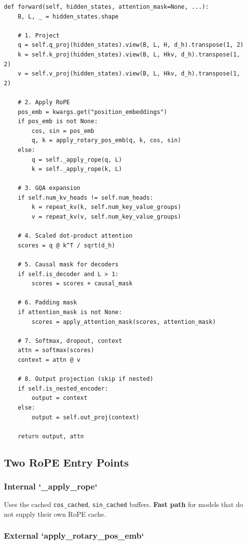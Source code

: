 \begin{lstlisting}
def forward(self, hidden_states, attention_mask=None, ...):
    B, L, _ = hidden_states.shape
    
    # 1. Project
    q = self.q_proj(hidden_states).view(B, L, H, d_h).transpose(1, 2)
    k = self.k_proj(hidden_states).view(B, L, Hkv, d_h).transpose(1, 2)
    v = self.v_proj(hidden_states).view(B, L, Hkv, d_h).transpose(1, 2)
    
    # 2. Apply RoPE
    pos_emb = kwargs.get("position_embeddings")
    if pos_emb is not None:
        cos, sin = pos_emb
        q, k = apply_rotary_pos_emb(q, k, cos, sin)
    else:
        q = self._apply_rope(q, L)
        k = self._apply_rope(k, L)
    
    # 3. GQA expansion
    if self.num_kv_heads != self.num_heads:
        k = repeat_kv(k, self.num_key_value_groups)
        v = repeat_kv(v, self.num_key_value_groups)
    
    # 4. Scaled dot-product attention
    scores = q @ k^T / sqrt(d_h)
    
    # 5. Causal mask for decoders
    if self.is_decoder and L > 1:
        scores = scores + causal_mask
    
    # 6. Padding mask
    if attention_mask is not None:
        scores = apply_attention_mask(scores, attention_mask)
    
    # 7. Softmax, dropout, context
    attn = softmax(scores)
    context = attn @ v
    
    # 8. Output projection (skip if nested)
    if self.is_nested_encoder:
        output = context
    else:
        output = self.out_proj(context)
    
    return output, attn
\end{lstlisting}

\subsection{Two RoPE Entry Points}

\subsubsection{Internal `\_apply\_rope`}

Uses the cached \texttt{cos\_cached}, \texttt{sin\_cached} buffers. \textbf{Fast path} for models 
that do not supply their own RoPE cache.

\subsubsection{External `apply\_rotary\_pos\_emb`}

